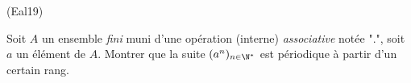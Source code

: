 \begin{tiny}(Eal19)\end{tiny} Soit $A$ un ensemble \emph{fini} muni d'une opération (interne) \emph{associative} notée "$.$", soit $a$ un élément de $A$. Montrer que la suite $(a^n)_{n\in\N^*}$ est périodique à partir d'un certain rang.